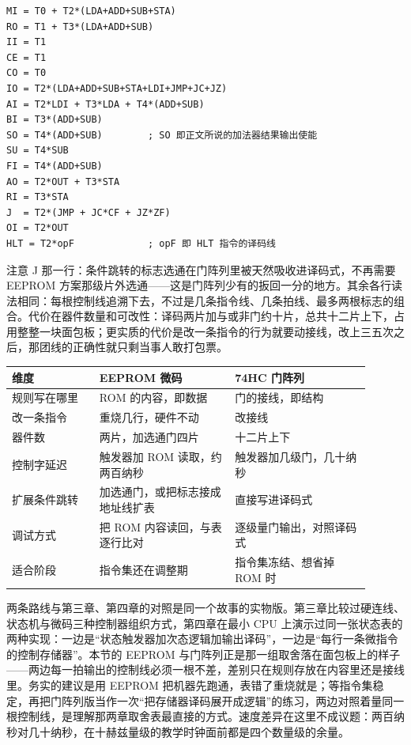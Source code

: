 \begin{lstlisting}
MI = T0 + T2*(LDA+ADD+SUB+STA)
RO = T1 + T3*(LDA+ADD+SUB)
II = T1
CE = T1
CO = T0
IO = T2*(LDA+ADD+SUB+STA+LDI+JMP+JC+JZ)
AI = T2*LDI + T3*LDA + T4*(ADD+SUB)
BI = T3*(ADD+SUB)
SO = T4*(ADD+SUB)        ; SO 即正文所说的加法器结果输出使能
SU = T4*SUB
FI = T4*(ADD+SUB)
AO = T2*OUT + T3*STA
RI = T3*STA
J  = T2*(JMP + JC*CF + JZ*ZF)
OI = T2*OUT
HLT = T2*opF             ; opF 即 HLT 指令的译码线
\end{lstlisting}

注意 J 那一行：条件跳转的标志选通在门阵列里被天然吸收进译码式，不再需要 EEPROM 方案那级片外选通——这是门阵列少有的扳回一分的地方。其余各行读法相同：每根控制线追溯下去，不过是几条指令线、几条拍线、最多两根标志的组合。代价在器件数量和可改性：译码两片加与或非门约十片，总共十二片上下，占用整整一块面包板；更实质的代价是改一条指令的行为就要动接线，改上三五次之后，那团线的正确性就只剩当事人敢打包票。

\begin{longtable}{L{0.22\linewidth}L{0.34\linewidth}L{0.34\linewidth}}
\toprule
维度 & EEPROM 微码 & 74HC 门阵列 \\
\midrule
规则写在哪里 & ROM 的内容，即数据 & 门的接线，即结构 \\
改一条指令 & 重烧几行，硬件不动 & 改接线 \\
器件数 & 两片，加选通门四片 & 十二片上下 \\
控制字延迟 & 触发器加 ROM 读取，约两百纳秒 & 触发器加几级门，几十纳秒 \\
扩展条件跳转 & 加选通门，或把标志接成地址线扩表 & 直接写进译码式 \\
调试方式 & 把 ROM 内容读回，与表逐行比对 & 逐级量门输出，对照译码式 \\
适合阶段 & 指令集还在调整期 & 指令集冻结、想省掉 ROM 时 \\
\bottomrule
\end{longtable}

两条路线与第三章、第四章的对照是同一个故事的实物版。第三章比较过硬连线、状态机与微码三种控制器组织方式，第四章在最小 CPU 上演示过同一张状态表的两种实现：一边是“状态触发器加次态逻辑加输出译码”，一边是“每行一条微指令的控制存储器”。本节的 EEPROM 与门阵列正是那一组取舍落在面包板上的样子——两边每一拍输出的控制线必须一根不差，差别只在规则存放在内容里还是接线里。务实的建议是用 EEPROM 把机器先跑通，表错了重烧就是；等指令集稳定，再把门阵列版当作一次“把存储器译码展开成逻辑”的练习，两边对照着量同一根控制线，是理解那两章取舍表最直接的方式。速度差异在这里不成议题：两百纳秒对几十纳秒，在十赫兹量级的教学时钟面前都是四个数量级的余量。

